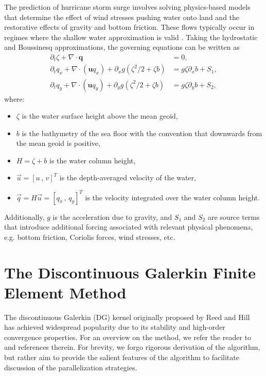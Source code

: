 The prediction of hurricane storm surge involves solving physics-based models that determine the effect of wind stresses pushing water onto land and the restorative effects of gravity and bottom friction. These flows typically occur in regimes where the shallow water approximation is valid \cite{Dutykh2016,Michoski2013}   . Taking the hydrostatic and Boussinesq approximations, the governing equations can be written as
\begin{align*}
\partial_t \zeta + \nabla \cdot \mathbf{q} &= 0,\\
\partial_t q_x + \nabla \cdot ( \mathbf{u}q_x) + \partial_x g(\zeta^2/2 + \zeta b) &= g \zeta \partial_x b + S_1,\\
\partial_t q_y + \nabla \cdot ( \mathbf{u}q_y) + \partial_y g( \zeta^2/2 + \zeta b) &= g \zeta \partial_y b + S_2,
\end{align*}
where:
\begin{itemize}
\item $\zeta$ is the water surface height above the mean geoid,
\item $b$ is the bathymetry of the sea floor with the convention that downwards from the mean geoid is positive,
\item $H = \zeta + b$ is the water column height,
\item $\vec{u} =\left[ u \, , \, v\right]^T$ is the depth-averaged velocity of the water,
\item $\vec{q} = H \vec{u} = \left[ q_x \, , \, q_y \right]^T$ is the velocity integrated over the water column height.
\end{itemize}
Additionally, $g$ is the acceleration due to gravity, and $S_1$ and $S_2$ are source terms that introduce additional forcing associated with relevant physical phenomena, e.g. bottom friction, Coriolis forces, wind stresses, etc. %

\section{The Discontinuous Galerkin Finite Element Method}

The discontinuous Galerkin (DG) kernel originally proposed by Reed and Hill~\cite{Reed73} has achieved widespread popularity due to its stability and high-order convergence properties. For an overview on the method, we refer the reader to~\cite{Cockburn01,Hesthaven08} and references therein. For brevity, we forgo  rigorous derivation of the algorithm, but rather aim to provide the salient features of the algorithm to facilitate discussion of the parallelization strategies.

